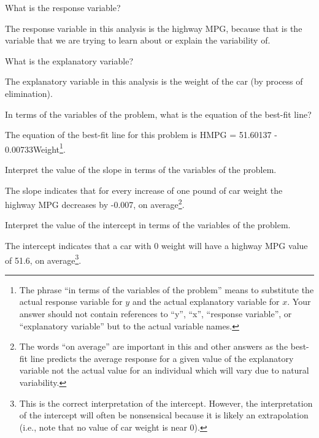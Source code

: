 \documentclass[10pt,openany]{book}\usepackage[]{graphicx}\usepackage[]{color}
\begin{document}
\begin{QAlist}
  \item What is the response variable?
  \begin{QAlist}
    \item The response variable in this analysis is the highway MPG, because that is the variable that we are trying to learn about or explain the variability of.
  \end{QAlist}
  \item What is the explanatory variable?
  \begin{QAlist}
    \item The explanatory variable in this analysis is the weight of the car (by process of elimination).
  \end{QAlist}
  \item In terms of the variables of the problem, what is the equation of the best-fit line?
  \begin{QAlist}
    \item The equation of the best-fit line for this problem is HMPG = 51.60137 - 0.00733Weight\footnote{The phrase ``in terms of the variables of the problem'' means to substitute the actual response variable for $y$ and the actual explanatory variable for $x$.  Your answer should not contain references to ``y'', ``x'', ``response variable'', or ``explanatory variable'' but to the actual variable names.}.
  \end{QAlist}
  \item Interpret the value of the slope in terms of the variables of the problem.
  \begin{QAlist}
    \item The slope indicates that for every increase of one pound of car weight the highway MPG decreases by -0.007, on average\footnote{The words ``on average'' are important in this and other answers as the best-fit line predicts the average response for a given value of the explanatory variable not the actual value for an individual which will vary due to natural variability.}.
  \end{QAlist}
  \item Interpret the value of the intercept in terms of the variables of the problem.
  \begin{QAlist}
    \item The intercept indicates that a car with 0 weight will have a highway MPG value of 51.6, on average\footnote{This is the correct interpretation of the intercept.  However, the interpretation of the intercept will often be nonsensical because it is likely an extrapolation (i.e., note that no value of car weight is near 0).}.

\end{QAlist}
\end{QAlist}
\end{document}

